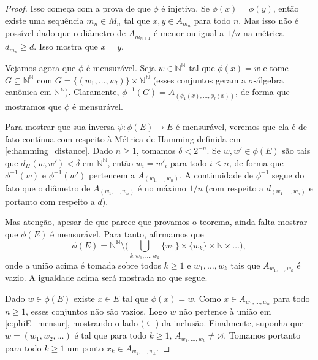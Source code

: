 \begin{proof}
  Isso começa com a prova de que $\phi$ é injetiva.
  Se $\phi(x) = \phi(y)$, então existe uma sequência $m_n \in M_n$ tal que $x, y \in A_{m_n}$ para todo $n$.
  Mas isso não é possível dado que o diâmetro de $A_{m_{n+1}}$ é menor ou igual a $1/n$ na métrica $d_{m_n} \geq d$.
  Isso mostra que $x = y$.

  Vejamos agora que $\phi$ é mensurável.
  Seja $w \in \mathbb{N}^\mathbb{N}$ tal que $\phi(x) = w$ e tome $G \subseteq \mathbb{N}^\mathbb{N}$ com $G = \{(w_1, \dots, w_l)\} \times \mathbb{N}^\mathbb{N}$ (esses conjuntos geram a $\sigma$-álgebra canônica em $\mathbb{N}^\mathbb{N}$).
  Claramente, $\phi^{-1}(G) = A_{(\phi_1(x), \dots, \phi_l(x))}$, de forma que mostramos que $\phi$ é mensurável.

  Para mostrar que sua inversa $\psi:\phi(E) \to E$ é mensurável, veremos que ela é de fato contínua com respeito à Métrica de Hamming definida em \eqref{e:hamming_distance}.
  Dado $n \geq 1$, tomamos $\delta < 2^{-n}$.
  Se $w, w' \in \phi(E)$ são tais que $d_H(w, w') < \delta$ em $\mathbb{N}^\mathbb{N}$, então $w_i = w'_i$ para todo $i \leq n$, de forma que $\phi^{-1}(w)$ e $\phi^{-1}(w')$ pertencem a $A_{(w_1, \dots, w_n)}$.
  A continuidade de $\phi^{-1}$ segue do fato que o diâmetro de $A_{(w_1, \dots, w_n)}$ é no máximo $1/n$ (com respeito a $d_{(w_1, \dots, w_n)}$ e portanto com respeito a $d$).

  Mas atenção, apesar de que parece que provamos o teorema, ainda falta mostrar que $\phi(E)$ é mensurável.
  Para tanto, afirmamos que
  \begin{equation}
    \label{e:phiE_mensur}
    \phi(E) = \mathbb{N}^\mathbb{N} \setminus \Big( \bigcup_{k, w_1, \dots, w_k} \{w_1\} \times \{w_k\} \times \mathbb{N} \times \dots \Big),
  \end{equation}
  onde a união acima é tomada sobre todos $k \geq 1$ e $w_1, \dots, w_k$ tais que $A_{w_1, \dots, w_k}$ é vazio.
  A igualdade acima será mostrada no que segue.

  Dado $w \in \phi(E)$ existe $x \in E$ tal que $\phi(x) = w$.
  Como $x \in A_{w_1, \dots, w_n}$ para todo $n \geq 1$, esses conjuntos não são vazios.
  Logo $w$ não pertence à união em \eqref{e:phiE_mensur}, mostrando o lado ($\subseteq$) da inclusão.
  Finalmente, suponha que $w = (w_1, w_2, \dots)$ é tal que para todo $k \geq 1$, $A_{w_1, \dots, w_k} \neq \varnothing$.
  Tomamos portanto para todo $k \geq 1$ um ponto $x_k \in A_{w_1, \dots, w_k}$.


\end{proof}
